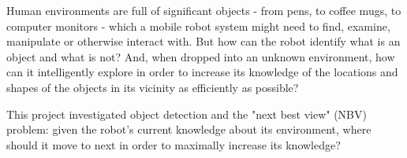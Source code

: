 
Human environments are full of significant objects - from pens, to coffee mugs, to computer monitors - which a mobile robot system might need to find, examine, manipulate or otherwise interact with.
But how can the robot identify what is an object and what is not? And, when dropped into an unknown environment, how can it intelligently explore in order to increase its knowledge of the locations and shapes of the objects in its vicinity as efficiently as possible?

This project investigated object detection and the "next best view" (NBV) problem: given the robot's current knowledge about its environment, where should it move to next in order to maximally increase its knowledge?